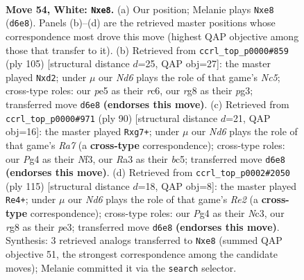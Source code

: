 \documentclass[11pt]{article}
\begin{document}
\clearpage

\begin{figure}[p]\centering
\begin{subfigure}{0.46\textwidth}\centering
\resizebox{\linewidth}{!}{%
\newchessgame
\chessboard[
  setfen={4bkr1/8/3N4/4p3/pP4P1/R3K3/8/8 w - - 7 54},
  showmover=false,
  pgfstyle=straightmove, color=movearrow, markmove={d6-e8}
]}
\caption{}
\end{subfigure}\hfill
\begin{subfigure}{0.46\textwidth}\centering
\resizebox{\linewidth}{!}{%
\newchessgame
\chessboard[
  setfen={8/5k2/2R5/5p2/2n5/r1P3P1/3BK3/8 b - - 7 53},
  showmover=false,
  pgfstyle=straightmove, color=movearrow, markmove={c4-d2}
]}
\caption{}
\end{subfigure}
\\[4pt]
\begin{subfigure}{0.46\textwidth}\centering
\resizebox{\linewidth}{!}{%
\newchessgame
\chessboard[
  setfen={6k1/R5r1/1p5p/2b5/P7/5N1K/5P2/8 w - - 2 46},
  showmover=false,
  pgfstyle=straightmove, color=movearrow, markmove={a7-g7}
]}
\caption{}
\end{subfigure}\hfill
\begin{subfigure}{0.46\textwidth}\centering
\resizebox{\linewidth}{!}{%
\newchessgame
\chessboard[
  setfen={8/4r1p1/1k6/6RP/1p3K2/1Bn1P3/8/8 b - - 2 58},
  showmover=false,
  pgfstyle=straightmove, color=movearrow, markmove={e7-e4}
]}
\caption{}
\end{subfigure}
\caption{\textbf{Move 54, White: \texttt{Nxe8}.} (a) Our position; Melanie plays \texttt{Nxe8} (\texttt{d6e8}). Panels (b)--(d) are the retrieved master positions whose correspondence most drove this move (highest QAP objective among those that transfer to it). (b) Retrieved from \texttt{ccrl\_top\_p0000\#859} (ply 105) [structural distance $d$=25, QAP obj=27]: the master played \texttt{Nxd2}; under $\mu$ our \emph{Nd6} plays the role of that game's \emph{Nc5}; cross-type roles: our \emph{p}e5 as their \emph{r}c6, our \emph{r}g8 as their \emph{p}g3; transferred move \texttt{d6e8} \textbf{(endorses this move)}. (c) Retrieved from \texttt{ccrl\_top\_p0000\#971} (ply 90) [structural distance $d$=21, QAP obj=16]: the master played \texttt{Rxg7+}; under $\mu$ our \emph{Nd6} plays the role of that game's \emph{Ra7} (a \textbf{cross-type} correspondence); cross-type roles: our \emph{P}g4 as their \emph{N}f3, our \emph{R}a3 as their \emph{b}c5; transferred move \texttt{d6e8} \textbf{(endorses this move)}. (d) Retrieved from \texttt{ccrl\_top\_p0002\#2050} (ply 115) [structural distance $d$=18, QAP obj=8]: the master played \texttt{Re4+}; under $\mu$ our \emph{Nd6} plays the role of that game's \emph{Re2} (a \textbf{cross-type} correspondence); cross-type roles: our \emph{P}g4 as their \emph{N}c3, our \emph{r}g8 as their \emph{p}e3; transferred move \texttt{d6e8} \textbf{(endorses this move)}. Synthesis: 3 retrieved analogs transferred to \texttt{Nxe8} (summed QAP objective 51, the strongest correspondence among the candidate moves); Melanie committed it via the \texttt{search} selector.}
\label{fig:thought-m106}
\end{figure}
\end{document}

